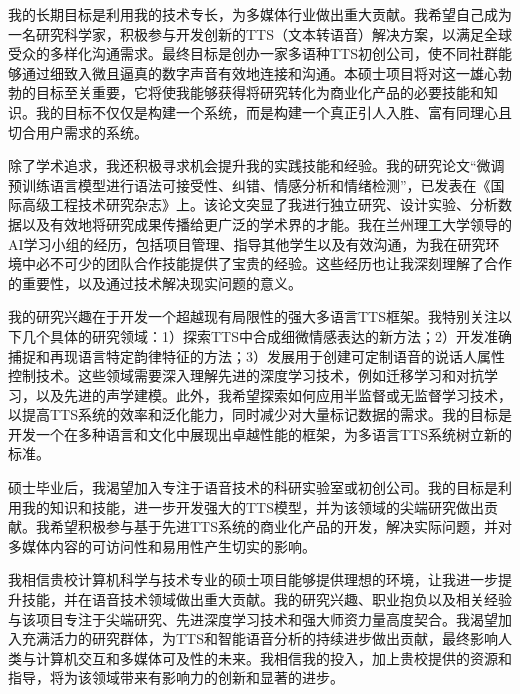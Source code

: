 \documentclass[12pt,a4paper]{article}
\begin{document}
\begin{CJK*}{UTF8}{gbsn}
我的长期目标是利用我的技术专长，为多媒体行业做出重大贡献。我希望自己成为一名研究科学家，积极参与开发创新的TTS（文本转语音）解决方案，以满足全球受众的多样化沟通需求。最终目标是创办一家多语种TTS初创公司，使不同社群能够通过细致入微且逼真的数字声音有效地连接和沟通。本硕士项目将对这一雄心勃勃的目标至关重要，它将使我能够获得将研究转化为商业化产品的必要技能和知识。我的目标不仅仅是构建一个系统，而是构建一个真正引人入胜、富有同理心且切合用户需求的系统。\newline

除了学术追求，我还积极寻求机会提升我的实践技能和经验。我的研究论文“微调预训练语言模型进行语法可接受性、纠错、情感分析和情绪检测”，已发表在《国际高级工程技术研究杂志》上。该论文突显了我进行独立研究、设计实验、分析数据以及有效地将研究成果传播给更广泛的学术界的才能。我在兰州理工大学领导的AI学习小组的经历，包括项目管理、指导其他学生以及有效沟通，为我在研究环境中必不可少的团队合作技能提供了宝贵的经验。这些经历也让我深刻理解了合作的重要性，以及通过技术解决现实问题的意义。\newline

我的研究兴趣在于开发一个超越现有局限性的强大多语言TTS框架。我特别关注以下几个具体的研究领域：1）探索TTS中合成细微情感表达的新方法；2）开发准确捕捉和再现语言特定韵律特征的方法；3）发展用于创建可定制语音的说话人属性控制技术。这些领域需要深入理解先进的深度学习技术，例如迁移学习和对抗学习，以及先进的声学建模。此外，我希望探索如何应用半监督或无监督学习技术，以提高TTS系统的效率和泛化能力，同时减少对大量标记数据的需求。我的目标是开发一个在多种语言和文化中展现出卓越性能的框架，为多语言TTS系统树立新的标准。 \newline

硕士毕业后，我渴望加入专注于语音技术的科研实验室或初创公司。我的目标是利用我的知识和技能，进一步开发强大的TTS模型，并为该领域的尖端研究做出贡献。我希望积极参与基于先进TTS系统的商业化产品的开发，解决实际问题，并对多媒体内容的可访问性和易用性产生切实的影响。 \newline

我相信贵校计算机科学与技术专业的硕士项目能够提供理想的环境，让我进一步提升技能，并在语音技术领域做出重大贡献。我的研究兴趣、职业抱负以及相关经验与该项目专注于尖端研究、先进深度学习技术和强大师资力量高度契合。我渴望加入充满活力的研究群体，为TTS和智能语音分析的持续进步做出贡献，最终影响人类与计算机交互和多媒体可及性的未来。我相信我的投入，加上贵校提供的资源和指导，将为该领域带来有影响力的创新和显著的进步。




\end{CJK*}
\end{document}
